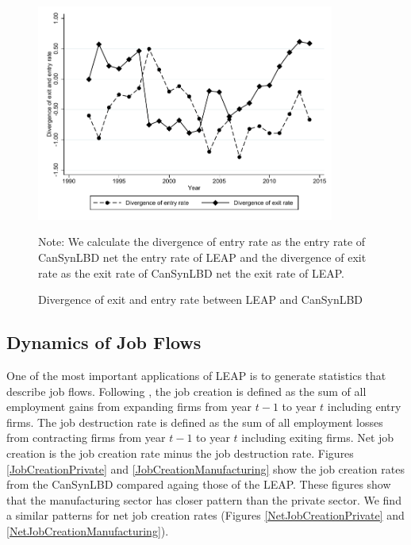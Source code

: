 \begin{figure} [H]
\centering
\caption{Divergence of exit and entry rate between LEAP and CanSynLBD} \label{Divergence}
\includegraphics[height=2.8in, width=.7\linewidth]{graphs/Divergence_of_exit_and_entry_rate_between_LEAP_and_CanSynLBD_bw.pdf} 
\begin{minipage}{0.85\textwidth}
{\footnotesize Note: \TableNote  We calculate the divergence of entry rate as the entry rate of CanSynLBD net the entry rate of LEAP and the divergence of exit rate as the exit rate of CanSynLBD net the exit rate of LEAP. \par}
\end{minipage}
\end{figure}

\subsection{Dynamics of Job Flows}

One of the most important applications of LEAP is to generate statistics that describe job flows. Following \cite{DavisHaltiwangerSchuh}, the job creation is defined as the sum of all employment gains from expanding firms from year $t-1$ to year $t$ including entry firms. The job destruction rate is defined as the sum of all employment losses from contracting firms from year $t-1$ to year $t$ including exiting firms. Net job creation is the job creation rate minus the job destruction rate. Figures \ref{JobCreationPrivate} and \ref{JobCreationManufacturing} show the job creation rates from the CanSynLBD compared againg those of the LEAP. These figures show that the manufacturing sector has closer pattern than the private sector. We find a similar patterns for net job creation rates (Figures \ref{NetJobCreationPrivate} and  \ref{NetJobCreationManufacturing}).

